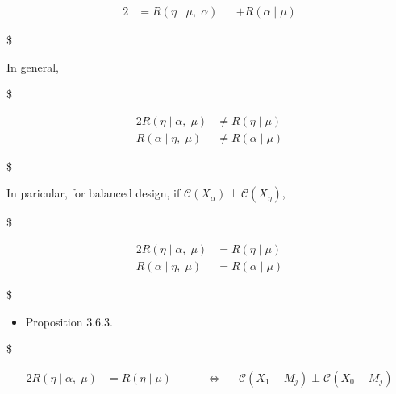 \documentclass[
]{book}
\providecommand{\tightlist}{%
  \setlength{\itemsep}{0pt}\setlength{\parskip}{0pt}}
\begin{document}
{{{\begin{alignat}{2}
&= R(\eta \; \Big \vert \; \mu, \; \alpha) &&+ R(\alpha \; \Big \vert \; \mu)  



\end{alignat}

\$

In general,

\$

\begin{alignat}{2}


R(\eta \; \Big \vert \; \alpha, \; \mu) &\not = R(\eta \; \Big \vert \; \mu)  
 
\\

R(\alpha \; \Big \vert \; \eta, \; \mu) & \not = R(\alpha \; \Big \vert \; \mu)  
 


\end{alignat}

\$

In paricular, for balanced design, if \(\mathcal{C}(X_\alpha) \perp \mathcal{C}(X_\eta)\),

\$

\begin{alignat}{2}


R(\eta \; \Big \vert \; \alpha, \; \mu) & = R(\eta \; \Big \vert \; \mu)  
 
\\

R(\alpha \; \Big \vert \; \eta, \; \mu) & = R(\alpha \; \Big \vert \; \mu)  
 


\end{alignat}

\$

\begin{itemize}
\tightlist
\item
  Proposition 3.6.3.
\end{itemize}

\$

\begin{alignat}{2}


R(\eta \; \Big \vert \; \alpha, \; \mu) & = R(\eta \; \Big \vert \; \mu)  
 


\; \; \; \; \; &&\iff \; \; \; \; \;


\mathcal{C}(X_1 - M_j) \perp \mathcal{C}(X_0 - M_j)

\\




\end{alignat}}}}
\end{document}
